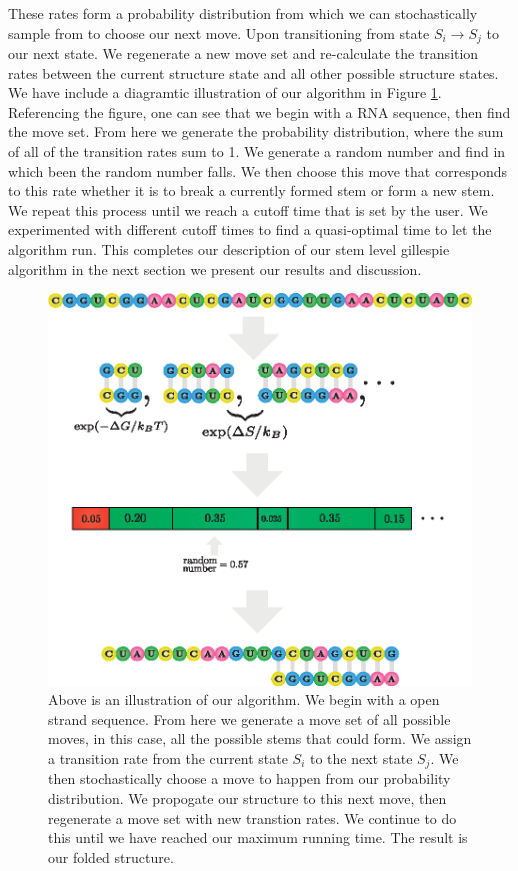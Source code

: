 \documentclass[11pt]{article}
\begin{document}
\begin{multicols}{2}
These rates form a probability distribution from which we can stochastically sample from to choose our next move. Upon transitioning from state $S_{i} \rightarrow S_{j}$ to our next state. We regenerate a new move set and re-calculate the transition rates between the current structure state and all other possible structure states. We have include a diagramtic illustration of our algorithm in Figure \ref{fig:gill_algo}. Referencing the figure, one can see that we begin with a RNA sequence, then find the move set. From here we generate the probability distribution, where the sum of all of the transition rates sum to 1. We generate a random number and find in which been the random number falls. We then choose this move that corresponds to this rate whether it is to break a currently formed stem or form a new stem. We repeat this process until we reach a cutoff time that is set by the user. We experimented with different cutoff times to find a quasi-optimal time to let the algorithm run.
This completes our description of our stem level gillespie algorithm in the next section we present our results and discussion.
\end{multicols}
\begin{figure}[H]
\centering
\includegraphics[scale = 1.1]{fig/rna_gillespie_algo}
\caption{Above is an illustration of our algorithm. We begin with a open strand sequence. From here we generate a move set of all possible moves, in this case, all the possible stems that could form. We assign a transition rate from the current state $S_{i}$ to the next state $S_{j}$. We then stochastically choose a move to happen from our probability distribution. We propogate our structure to this next move, then regenerate a move set with new transtion rates. We continue to do this until we have reached our maximum running time. The result is our folded structure. }
\label{fig:gill_algo}
\end{figure}
\end{document}
